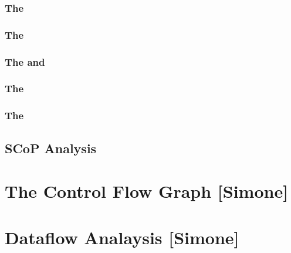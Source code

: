 \subsubsection{The }
\subsubsection{The }
\subsubsection{The  and } 
\subsubsection{The }
\subsubsection{The }

\subsection{SCoP Analysis}



\section{The Control Flow Graph [Simone]}
\label{insieme:analysis:cfg}



\section{Dataflow Analaysis [Simone]}
\label{insieme:analysis:dtaflow}

